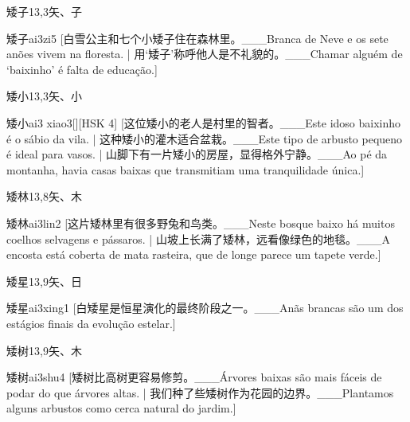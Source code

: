\begin{entry}{矮子}{13,3}{⽮、⼦}
  \begin{phonetics}{矮子}{ai3zi5}
    [白雪公主和七个小矮子住在森林里。___Branca de Neve e os sete anões vivem na floresta. | 用`矮子'称呼他人是不礼貌的。___Chamar alguém de `baixinho' é falta de educação.]
  \end{phonetics}
\end{entry}

\begin{entry}{矮小}{13,3}{⽮、⼩}
  \begin{phonetics}{矮小}{ai3 xiao3}[][HSK 4]
    [这位矮小的老人是村里的智者。___Este idoso baixinho é o sábio da vila. | 这种矮小的灌木适合盆栽。___Este tipo de arbusto pequeno é ideal para vasos. | 山脚下有一片矮小的房屋，显得格外宁静。___Ao pé da montanha, havia casas baixas que transmitiam uma tranquilidade única.]
  \end{phonetics}
\end{entry}

\begin{entry}{矮林}{13,8}{⽮、⽊}
  \begin{phonetics}{矮林}{ai3lin2}
    [这片矮林里有很多野兔和鸟类。___Neste bosque baixo há muitos coelhos selvagens e pássaros. | 山坡上长满了矮林，远看像绿色的地毯。___A encosta está coberta de mata rasteira, que de longe parece um tapete verde.]
  \end{phonetics}
\end{entry}

\begin{entry}{矮星}{13,9}{⽮、⽇}
  \begin{phonetics}{矮星}{ai3xing1}
    [白矮星是恒星演化的最终阶段之一。___Anãs brancas são um dos estágios finais da evolução estelar.]
  \end{phonetics}
\end{entry}

\begin{entry}{矮树}{13,9}{⽮、⽊}
  \begin{phonetics}{矮树}{ai3shu4}
    [矮树比高树更容易修剪。___Árvores baixas são mais fáceis de podar do que árvores altas. | 我们种了些矮树作为花园的边界。___Plantamos alguns arbustos como cerca natural do jardim.]
  \end{phonetics}
\end{entry}

